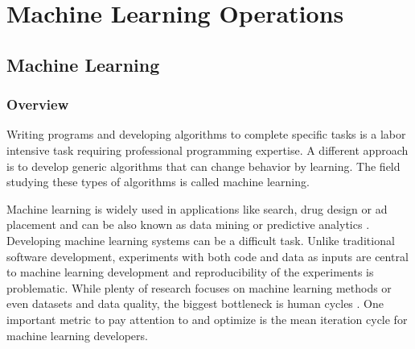 \chapter{Machine Learning Operations}


\section{Machine Learning} %
\label{sec:ml}

\subsection{Overview}

Writing programs and developing algorithms to complete specific tasks is a labor intensive task requiring professional programming expertise. A different approach is to develop generic algorithms that can change behavior by learning. The field studying these types of algorithms is called machine learning.

Machine learning is widely used in applications like search, drug design or ad placement and can be also known as data mining or predictive analytics \parencite{domingosFewUsefulThings2012}. Developing machine learning systems can be a difficult task. Unlike traditional software development, experiments with both code and data as inputs are central to machine learning development \parencite{zahariaAcceleratingMachineLearning2018} and reproducibility of the experiments is problematic. While plenty of research focuses on machine learning methods or even datasets and data quality, the biggest bottleneck is human cycles \parencite{domingosFewUsefulThings2012}. One important metric to pay attention to and optimize is the mean iteration cycle for machine learning developers.



